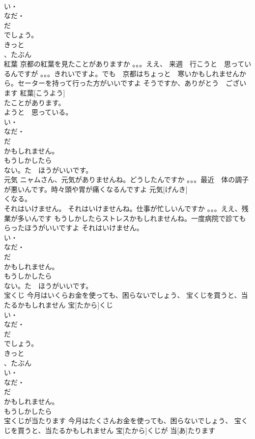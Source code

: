 \documentclass[8pt]{extreport}
\begin{document}
\begin{CJK}{UTF8}{min}
\\	い・
\\	なだ・
\\	だ
\\	でしょう。
\\	きっと
\\	、たぶん
\\	紅葉	京都の紅葉を見たことがありますか 。。。ええ、 来週　行こうと　思っているんですが 。。。きれいですよ。でも　京都はちょっと　寒いかもしれませんから。セーターを持って行った方がいいですよ そうですか、ありがとう　ございます	紅葉[こうよう]			
\\	たことがあります。
\\	ようと　思っている。
\\	い・
\\	なだ・
\\	だ
\\	かもしれません。
\\	もうしかしたら
\\	ない。た　ほうがいいです。
\\	元気	ニャムさん、元気がありませんね。どうしたんですか 。。。最近　体の調子が悪いんです。時々頭や胃が痛くなるんですよ	元気[げんき]				
\\	くなる。
\\	それはいけません。	それはいけませんね。仕事が忙しいんですか 。。。ええ、残業が多いんです もうしかしたらストレスかもしれませんね。一度病院で診てもらったほうがいいですよ	それはいけません。			
\\	い・
\\	なだ・
\\	だ
\\	かもしれません。
\\	もうしかしたら
\\	ない。た　ほうがいいです。
\\	宝くじ	今月はいくらお金を使っても、困らないでしょう、 宝くじを買うと、当たるかもしれません	宝[たから]くじ			
\\	い・
\\	なだ・
\\	だ
\\	でしょう。
\\	きっと
\\	、たぶん
\\	い・
\\	なだ・
\\	だ
\\	かもしれません。
\\	もうしかしたら
\\	宝くじが当たります	今月はたくさんお金を使っても、困らないでしょう、 宝くじを買うと、当たるかもしれません	宝[たから]くじが 当[あ]たります			

\end{CJK}
\end{document}
